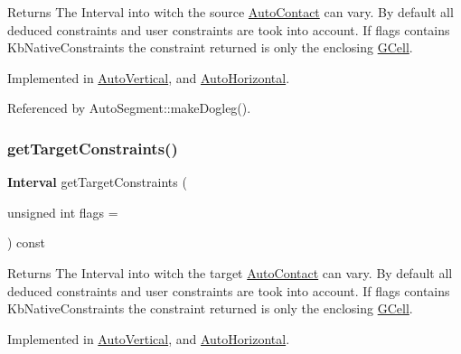 \begin{DoxyReturn}{Returns}
The Interval into witch the source \mbox{\hyperlink{classKatabatic_1_1AutoContact}{Auto\+Contact}} can vary. By default all deduced constraints and user constraints are took into account. If {\ttfamily flags} contains {\ttfamily Kb\+Native\+Constraints} the constraint returned is only the enclosing \mbox{\hyperlink{classKatabatic_1_1GCell}{G\+Cell}}. 
\end{DoxyReturn}


Implemented in \mbox{\hyperlink{classKatabatic_1_1AutoVertical_a3239751f475bc65adb9d56f6c771ebb0}{Auto\+Vertical}}, and \mbox{\hyperlink{classKatabatic_1_1AutoHorizontal_a3239751f475bc65adb9d56f6c771ebb0}{Auto\+Horizontal}}.



Referenced by Auto\+Segment\+::make\+Dogleg().

\mbox{\label{classKatabatic_1_1AutoSegment_a9c1b8b3cd57fb7b0bf60c7a6148237c2}} 
\subsubsection{\texorpdfstring{get\+Target\+Constraints()}{getTargetConstraints()}}
{\footnotesize\ttfamily \textbf{ Interval} get\+Target\+Constraints (\begin{DoxyParamCaption}\item[{unsigned int}]{flags = {} }\end{DoxyParamCaption}) const\hspace{0.3cm}{\ttfamily [pure virtual]}}

\begin{DoxyReturn}{Returns}
The Interval into witch the target \mbox{\hyperlink{classKatabatic_1_1AutoContact}{Auto\+Contact}} can vary. By default all deduced constraints and user constraints are took into account. If {\ttfamily flags} contains {\ttfamily Kb\+Native\+Constraints} the constraint returned is only the enclosing \mbox{\hyperlink{classKatabatic_1_1GCell}{G\+Cell}}. 
\end{DoxyReturn}


Implemented in \mbox{\hyperlink{classKatabatic_1_1AutoVertical_ad2b5aeb2604548378c8d78c60862091f}{Auto\+Vertical}}, and \mbox{\hyperlink{classKatabatic_1_1AutoHorizontal_ad2b5aeb2604548378c8d78c60862091f}{Auto\+Horizontal}}.



